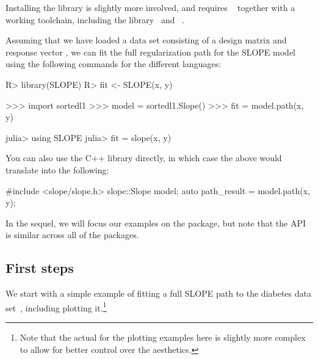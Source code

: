 \documentclass[article]{jss}
\begin{document}
Installing the  library is slightly more involved, and requires
~\citep{kitware2025} together with a working  toolchain, including
the  library~\citep{guennebaud2010a} and ~\citep{dagum1998}.

Assuming that we have loaded a data set consisting of a design
matrix  and response vector , we can fit the full regularization
path for the SLOPE model using the following commands for the different languages:

\begin{minipage}[t]{0.25\textwidth}%
  \textbf{}
  \begin{Code}
R> library(SLOPE)
R> fit <- SLOPE(x, y)
  \end{Code}
\end{minipage}
\hfill
\begin{minipage}[t]{0.32\textwidth}

  \textbf{}
  \begin{Code}
>>> import sortedl1
>>> model = sortedl1.Slope()
>>> fit = model.path(x, y)
  \end{Code}
\end{minipage}
\hfill
\begin{minipage}[t]{0.32\textwidth}
  \textbf{}
  \begin{Code}
julia> using SLOPE
julia> fit = slope(x, y)
  \end{Code}
\end{minipage}

\medskip

You can also use the C++ library directly, in
which case the above would translate into the
following:
\begin{Code}
#include <slope/slope.h>
slope::Slope model;
auto path_result = model.path(x, y);
\end{Code}

In the sequel, we will focus our examples on the  package, but
note that the API is similar across all of the packages.

\subsection{First steps}

We start with a simple example of fitting a full SLOPE path to the diabetes
data set~\citep{efron2004}, including plotting it.\footnote{Note that
  the actual for the plotting examples here is slightly more complex
  to allow for better control over the aesthetics.}
\end{document}
